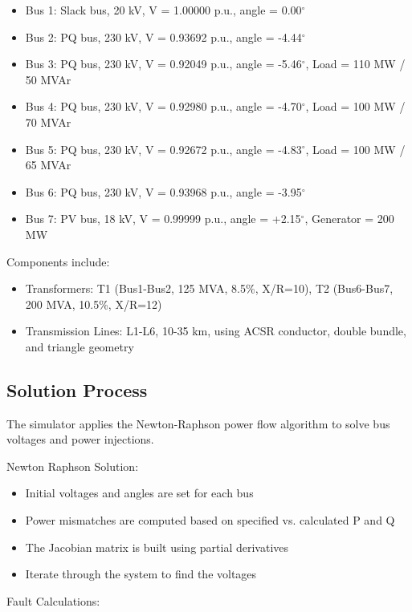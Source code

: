 \documentclass{article}
\begin{document}
	\begin{itemize}
		\item Bus 1: Slack bus, 20 kV, V = 1.00000 p.u., angle = 0.00$^{\circ}$
		\item Bus 2: PQ bus, 230 kV, V = 0.93692 p.u., angle = -4.44$^{\circ}$
		\item Bus 3: PQ bus, 230 kV, V = 0.92049 p.u., angle = -5.46$^{\circ}$, Load = 110 MW / 50 MVAr
		\item Bus 4: PQ bus, 230 kV, V = 0.92980 p.u., angle = -4.70$^{\circ}$, Load = 100 MW / 70 MVAr
		\item Bus 5: PQ bus, 230 kV, V = 0.92672 p.u., angle = -4.83$^{\circ}$, Load = 100 MW / 65 MVAr
		\item Bus 6: PQ bus, 230 kV, V = 0.93968 p.u., angle = -3.95$^{\circ}$
		\item Bus 7: PV bus, 18 kV, V = 0.99999 p.u., angle = +2.15$^{\circ}$, Generator = 200 MW
	\end{itemize}
	
	\noindent
	Components include:
	
	\begin{itemize}
		\item Transformers: T1 (Bus1-Bus2, 125 MVA, 8.5\%, X/R=10), T2 (Bus6-Bus7, 200 MVA, 10.5\%, X/R=12)
		\item Transmission Lines: L1-L6, 10-35 km, using ACSR conductor, double bundle, and triangle geometry
	\end{itemize}
	
	\subsection{Solution Process}
	The simulator applies the Newton-Raphson power flow algorithm to solve bus voltages and power injections.
	
	\noindent
	Newton Raphson Solution:
	
	\begin{itemize}
		\item Initial voltages and angles are set for each bus
		\item Power mismatches are computed based on specified vs. calculated P and Q
		\item The Jacobian matrix is built using partial derivatives
		\item Iterate through the system to find the voltages
	\end{itemize}
	
	\noindent
	Fault Calculations:
	
\end{document}
